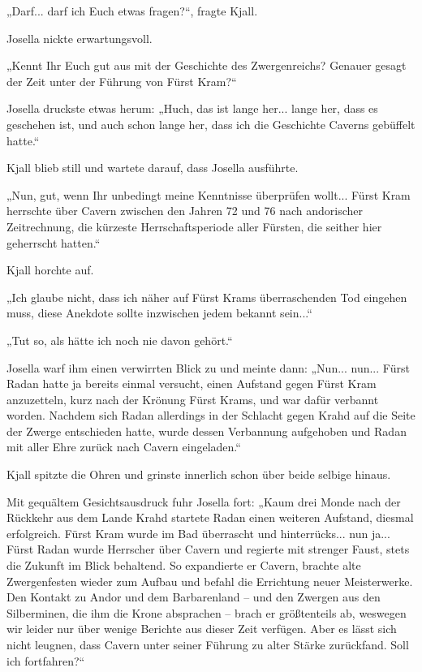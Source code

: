 \documentclass[10pt, a4paper, oneside]{book}
\begin{document}
„Darf... darf ich Euch etwas fragen?“, fragte Kjall.

Josella nickte erwartungsvoll.

„Kennt Ihr Euch gut aus mit der Geschichte des Zwergenreichs? Genauer gesagt der Zeit unter der Führung von Fürst Kram?“

Josella druckste etwas herum: „Huch, das ist lange her... lange her, dass es geschehen ist, und auch schon lange her, dass ich die Geschichte Caverns gebüffelt hatte.“

Kjall blieb still und wartete darauf, dass Josella ausführte.

„Nun, gut, wenn Ihr unbedingt meine Kenntnisse überprüfen wollt... Fürst Kram herrschte über Cavern zwischen den Jahren 72 und 76 nach andorischer Zeitrechnung, die kürzeste Herrschaftsperiode aller Fürsten, die seither hier geherrscht hatten.“

Kjall horchte auf.

„Ich glaube nicht, dass ich näher auf Fürst Krams überraschenden Tod eingehen muss, diese Anekdote sollte inzwischen jedem bekannt sein...“

„Tut so, als hätte ich noch nie davon gehört.“

Josella warf ihm einen verwirrten Blick zu und meinte dann: „Nun... nun... Fürst Radan hatte ja bereits einmal versucht, einen Aufstand gegen Fürst Kram anzuzetteln, kurz nach der Krönung Fürst Krams, und war dafür verbannt worden. Nachdem sich Radan allerdings in der Schlacht gegen Krahd auf die Seite der Zwerge entschieden hatte, wurde dessen Verbannung aufgehoben und Radan mit aller Ehre zurück nach Cavern eingeladen.“

Kjall spitzte die Ohren und grinste innerlich schon über beide selbige hinaus.

Mit gequältem Gesichtsausdruck fuhr Josella fort: „Kaum drei Monde nach der Rückkehr aus dem Lande Krahd startete Radan einen weiteren Aufstand, diesmal erfolgreich. Fürst Kram wurde im Bad überrascht und hinterrücks... nun ja... Fürst Radan wurde Herrscher über Cavern und regierte mit strenger Faust, stets die Zukunft im Blick behaltend. So expandierte er Cavern, brachte alte Zwergenfesten wieder zum Aufbau und befahl die Errichtung neuer Meisterwerke. Den Kontakt zu Andor und dem Barbarenland – und den Zwergen aus den Silberminen, die ihm die Krone absprachen – brach er größtenteils ab, weswegen wir leider nur über wenige Berichte aus dieser Zeit verfügen. Aber es lässt sich nicht leugnen, dass Cavern unter seiner Führung zu alter Stärke zurückfand. Soll ich fortfahren?“
\end{document}
